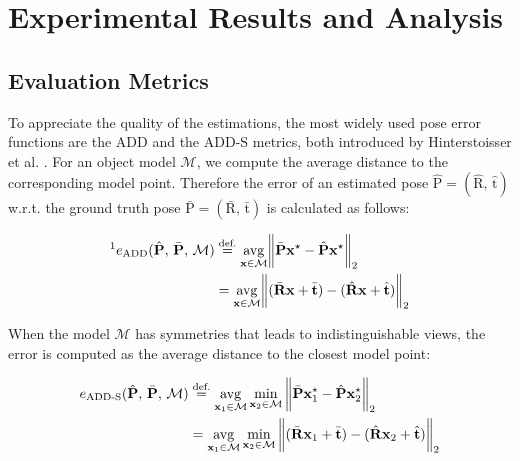 
\chapter{Experimental Results and Analysis}\label{chapter:presentation_of_the_results}

\section{Evaluation Metrics}

To appreciate the quality of the estimations, the most widely used pose error functions are the \ac{ADD} and the \ac{ADD-S} metrics, both introduced by Hinterstoisser et al. \cite{10.1007/978-3-642-37331-2_42}. For an object model $\mathcal{M}$, we compute the average distance to the corresponding model point. Therefore the error of an estimated pose $\hat{\bm{\mathrm{P}}}=(\hat{\bm{\mathrm{R}}},\,\hat{\bm{\mathrm{t}}})$ w.r.t. the ground truth pose $\bar{\bm{\mathrm{P}}}=(\bar{\bm{\mathrm{R}}},\,\bar{\bm{\mathrm{t}}})$ is calculated as follows:

\begin{align}
	\textit{\footnotemark}e_\mathrm{ADD}(\hat{\bm{\mathrm{P}}},\,\bar{\bm{\mathrm{P}}},\,\mathcal{M})&\stackrel{\text{def.}}{=}\underset{\bm{\mathrm{x}}\in\mathcal{M}}{\mathrm{avg}}\norm\bigg{\bar{\bm{\mathrm{P}}}\bm{\mathrm{x}}^\star-\hat{\bm{\mathrm{P}}}\bm{\mathrm{x}}^\star}_2 \\
	&=\underset{\bm{\mathrm{x}}\in\mathcal{M}}{\mathrm{avg}}\norm\bigg{(\bar{\bm{\mathrm{R}}}\bm{\mathrm{x}}+\bar{\bm{\mathrm{t}}})-(\hat{\bm{\mathrm{R}}}\bm{\mathrm{x}}+\hat{\bm{\mathrm{t}}})}_2
\end{align}

\noindent When the model $\mathcal{M}$ has symmetries that leads to indistinguishable views, the error is computed as the average distance to the closest model point:
 
\begin{align}
	e_{\mathrm{ADD}\text{-}\mathrm{S}}(\hat{\bm{\mathrm{P}}},\,\bar{\bm{\mathrm{P}}},\,\mathcal{M})&\stackrel{\text{def.}}{=} \underset{\bm{\mathrm{x}}_1\in\mathcal{M}}{\mathrm{avg}}\min\limits_{\bm{\mathrm{x}}_2\in\mathcal{M}}\norm\bigg{\bar{\bm{\mathrm{P}}}\bm{\mathrm{x}}_1^\star-\hat{\bm{\mathrm{P}}}\bm{\mathrm{x}}_2^\star}_2 \\
	&=\underset{\bm{\mathrm{x}}_1\in\mathcal{M}}{\mathrm{avg}}\min\limits_{\bm{\mathrm{x}}_2\in\mathcal{M}}\norm\bigg{(\bar{\bm{\mathrm{R}}}\bm{\mathrm{x}}_1+\bar{\bm{\mathrm{t}}})-(\hat{\bm{\mathrm{R}}}\bm{\mathrm{x}}_2+\hat{\bm{\mathrm{t}}})}_2
\end{align}

